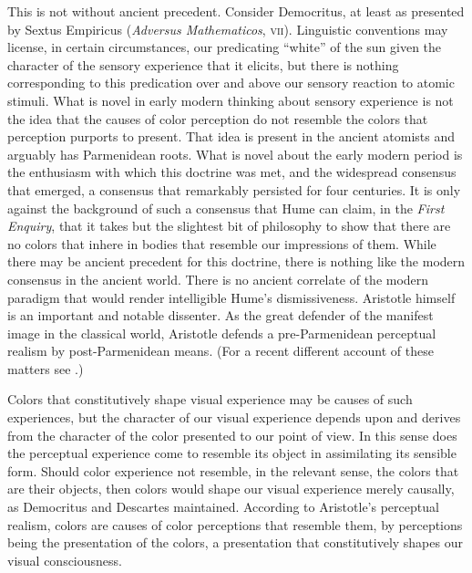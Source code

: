 This is not without ancient precedent. Consider Democritus, at least as presented by Sextus Empiricus (\emph{Adversus Mathematicos}, \textsc{vii}). Linguistic conventions may license, in certain circumstances, our predicating ``white'' of the sun given the character of the sensory experience that it elicits, but there is nothing corresponding to this predication over and above our sensory reaction to atomic stimuli. What is novel in early modern thinking about sensory experience is not the idea that the causes of color perception do not resemble the colors that perception purports to present. That idea is present in the ancient atomists and arguably has Parmenidean roots. What is novel about the early modern period is the enthusiasm with which this doctrine was met, and the widespread consensus that emerged, a consensus that remarkably persisted for four centuries. It is only against the background of such a consensus that Hume can claim, in the \emph{First Enquiry}, that it takes but the slightest bit of philosophy to show that there are no colors that inhere in bodies that resemble our impressions of them. While there may be ancient precedent for this doctrine, there is nothing like the modern consensus in the ancient world. There is no ancient correlate of the modern paradigm that would render intelligible Hume's dismissiveness. Aristotle himself is an important and notable dissenter. As the great defender of the manifest image in the classical world, Aristotle defends a pre-Parmenidean perceptual realism by post-Parmenidean means. (For a recent different account of these matters see \citealt{Lee:2011ys}.)

Colors that constitutively shape visual experience may be causes of such experiences, but the character of our visual experience depends upon and derives from the character of the color presented to our point of view. In this sense does the perceptual experience come to resemble its object in assimilating its sensible form. Should color experience not resemble, in the relevant sense, the colors that are their objects, then colors would shape our visual experience merely causally, as Democritus and Descartes maintained. According to Aristotle's perceptual realism, colors are causes of color perceptions that resemble them, by perceptions being the presentation of the colors, a presentation that constitutively shapes our visual consciousness.

